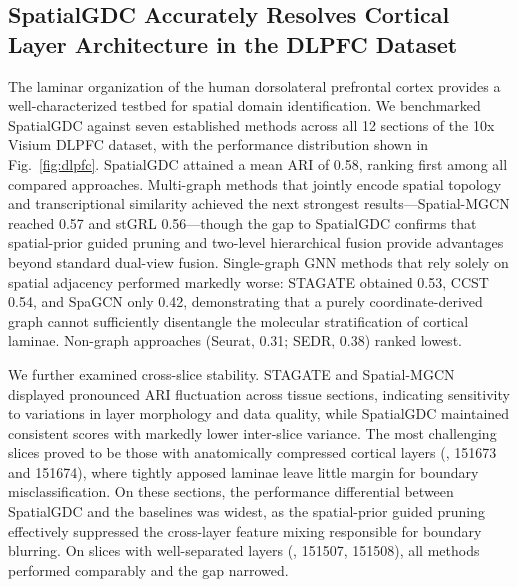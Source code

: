 \documentclass[lettersize,journal]{IEEEtran}
\begin{document}
\subsection{SpatialGDC Accurately Resolves Cortical Layer Architecture in the DLPFC Dataset}

The laminar organization of the human dorsolateral prefrontal cortex provides a well-characterized testbed for spatial domain identification. We benchmarked SpatialGDC against seven established methods across all 12 sections of the 10x Visium DLPFC dataset, with the performance distribution shown in Fig.~\ref{fig:dlpfc}. SpatialGDC attained a mean ARI of 0.58, ranking first among all compared approaches. Multi-graph methods that jointly encode spatial topology and transcriptional similarity achieved the next strongest results---Spatial-MGCN reached 0.57 and stGRL 0.56---though the gap to SpatialGDC confirms that spatial-prior guided pruning and two-level hierarchical fusion provide advantages beyond standard dual-view fusion. Single-graph GNN methods that rely solely on spatial adjacency performed markedly worse: STAGATE obtained 0.53, CCST 0.54, and SpaGCN only 0.42, demonstrating that a purely coordinate-derived graph cannot sufficiently disentangle the molecular stratification of cortical laminae. Non-graph approaches (Seurat, 0.31; SEDR, 0.38) ranked lowest.

We further examined cross-slice stability. STAGATE and Spatial-MGCN displayed pronounced ARI fluctuation across tissue sections, indicating sensitivity to variations in layer morphology and data quality, while SpatialGDC maintained consistent scores with markedly lower inter-slice variance. The most challenging slices proved to be those with anatomically compressed cortical layers (\eg, 151673 and 151674), where tightly apposed laminae leave little margin for boundary misclassification. On these sections, the performance differential between SpatialGDC and the baselines was widest, as the spatial-prior guided pruning effectively suppressed the cross-layer feature mixing responsible for boundary blurring. On slices with well-separated layers (\eg, 151507, 151508), all methods performed comparably and the gap narrowed.
\end{document}
